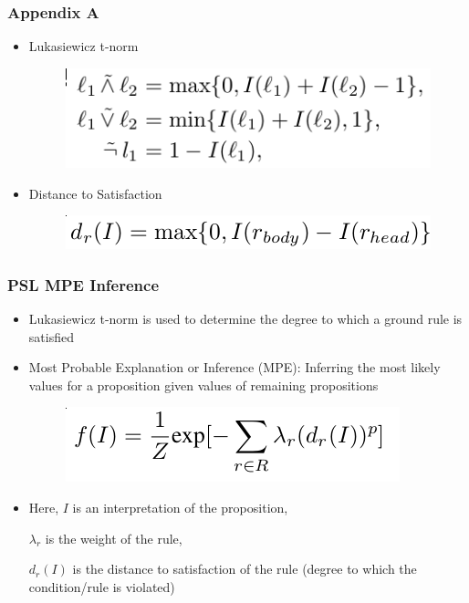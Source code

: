 \documentclass[red,handout]{beamer}
\begin{document}
\begin{frame}[noframenumbering]
    \frametitle{Appendix A}
    \begin{itemize}
        \item  Lukasiewicz t-norm
    \begin{figure}
        \includegraphics[scale=0.4]{luke_norm}
    \end{figure}
    \item Distance to Satisfaction
    \begin{figure}
        \includegraphics[scale=0.4]{dis_sat_psl}
    \end{figure}
\end{itemize}

\end{frame}
\begin{frame}[noframenumbering]
    \frametitle{PSL MPE Inference}
    \begin{itemize}
        \item Lukasiewicz t-norm is used to determine the degree to which a ground rule is satisfied
        \item Most Probable Explanation or Inference (MPE): Inferring the most likely values for a proposition given values of remaining propositions
            \begin{figure}
                \includegraphics[scale=0.4]{psl_equation}
            \end{figure}
        \item Here,
            $I$ is an interpretation of the proposition,

            $\lambda_r$ is the weight of the rule,

            $d_r(I)$ is the distance to satisfaction of the rule (degree to which the condition/rule is violated)
        \end{itemize}
\end{frame}
\end{document}
